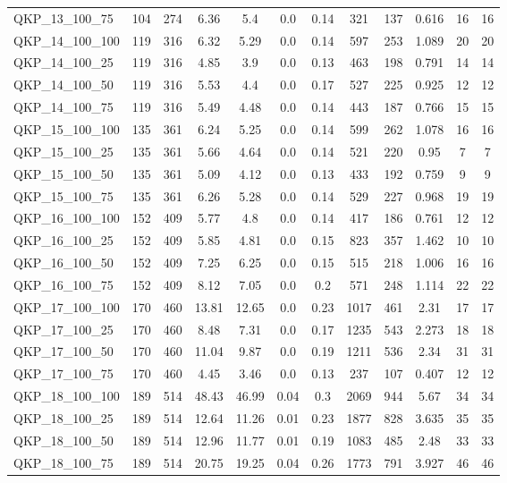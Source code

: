 \begin{table}[!h]
{\begin{tabular}{lccccccccccc}
QKP\_13\_100\_75 & 104 & 274 & 6.36 & 5.4 & 0.0 & 0.14 & 321 & 137 & 0.616 & 16 & 16\\
QKP\_14\_100\_100 & 119 & 316 & 6.32 & 5.29 & 0.0 & 0.14 & 597 & 253 & 1.089 & 20 & 20\\
QKP\_14\_100\_25 & 119 & 316 & 4.85 & 3.9 & 0.0 & 0.13 & 463 & 198 & 0.791 & 14 & 14\\
QKP\_14\_100\_50 & 119 & 316 & 5.53 & 4.4 & 0.0 & 0.17 & 527 & 225 & 0.925 & 12 & 12\\
QKP\_14\_100\_75 & 119 & 316 & 5.49 & 4.48 & 0.0 & 0.14 & 443 & 187 & 0.766 & 15 & 15\\
QKP\_15\_100\_100 & 135 & 361 & 6.24 & 5.25 & 0.0 & 0.14 & 599 & 262 & 1.078 & 16 & 16\\
QKP\_15\_100\_25 & 135 & 361 & 5.66 & 4.64 & 0.0 & 0.14 & 521 & 220 & 0.95 & 7 & 7\\
QKP\_15\_100\_50 & 135 & 361 & 5.09 & 4.12 & 0.0 & 0.13 & 433 & 192 & 0.759 & 9 & 9\\
QKP\_15\_100\_75 & 135 & 361 & 6.26 & 5.28 & 0.0 & 0.14 & 529 & 227 & 0.968 & 19 & 19\\
QKP\_16\_100\_100 & 152 & 409 & 5.77 & 4.8 & 0.0 & 0.14 & 417 & 186 & 0.761 & 12 & 12\\
QKP\_16\_100\_25 & 152 & 409 & 5.85 & 4.81 & 0.0 & 0.15 & 823 & 357 & 1.462 & 10 & 10\\
QKP\_16\_100\_50 & 152 & 409 & 7.25 & 6.25 & 0.0 & 0.15 & 515 & 218 & 1.006 & 16 & 16\\
QKP\_16\_100\_75 & 152 & 409 & 8.12 & 7.05 & 0.0 & 0.2 & 571 & 248 & 1.114 & 22 & 22\\
QKP\_17\_100\_100 & 170 & 460 & 13.81 & 12.65 & 0.0 & 0.23 & 1017 & 461 & 2.31 & 17 & 17\\
QKP\_17\_100\_25 & 170 & 460 & 8.48 & 7.31 & 0.0 & 0.17 & 1235 & 543 & 2.273 & 18 & 18\\
QKP\_17\_100\_50 & 170 & 460 & 11.04 & 9.87 & 0.0 & 0.19 & 1211 & 536 & 2.34 & 31 & 31\\
QKP\_17\_100\_75 & 170 & 460 & 4.45 & 3.46 & 0.0 & 0.13 & 237 & 107 & 0.407 & 12 & 12\\
QKP\_18\_100\_100 & 189 & 514 & 48.43 & 46.99 & 0.04 & 0.3 & 2069 & 944 & 5.67 & 34 & 34\\
QKP\_18\_100\_25 & 189 & 514 & 12.64 & 11.26 & 0.01 & 0.23 & 1877 & 828 & 3.635 & 35 & 35\\
QKP\_18\_100\_50 & 189 & 514 & 12.96 & 11.77 & 0.01 & 0.19 & 1083 & 485 & 2.48 & 33 & 33\\
QKP\_18\_100\_75 & 189 & 514 & 20.75 & 19.25 & 0.04 & 0.26 & 1773 & 791 & 3.927 & 46 & 46\\

\end{tabular}}
\end{table}
